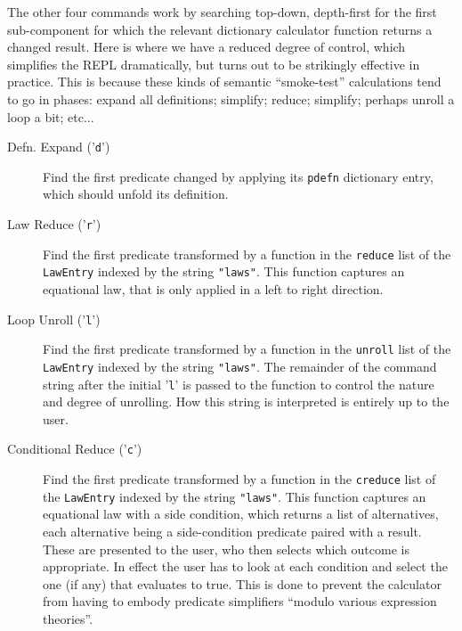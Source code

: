 The other four commands work by searching top-down, depth-first for
the first sub-component for which the relevant dictionary calculator
function returns a changed result.
Here is where we have a reduced degree of control,
which simplifies the REPL dramatically,
but turns out to be strikingly effective in practice.
This is because these kinds of semantic ``smoke-test'' calculations
tend to go in phases: expand all definitions; simplify; reduce; simplify;
perhaps unroll a loop a bit; etc...
\begin{description}
  \item[Defn. Expand ('\texttt{d}')]
    Find the first predicate changed by applying its
     \texttt{pdefn} dictionary entry, which should unfold its definition.
  \item[Law Reduce ('\texttt{r}')]
    Find the first predicate transformed by a function
    in the \texttt{reduce} list of the \texttt{LawEntry} indexed
     by the string \texttt{"laws"}.
     This function captures an equational law,
     that is only applied in a left to right direction.
  \item[Loop Unroll ('\texttt{l}')]
    Find the first predicate transformed by a function
    in the \texttt{unroll} list of the \texttt{LawEntry} indexed
     by the string \texttt{"laws"}.
    The remainder of the command string after the initial '\texttt{l}'
    is passed to the function to control the nature and degree
    of unrolling. How this string is interpreted is entirely
    up to the user.
  \item[Conditional Reduce ('\texttt{c}')]
    Find the first predicate transformed by a function
    in the \texttt{creduce} list of the \texttt{LawEntry} indexed
     by the string \texttt{"laws"}.
     This function captures an equational law with a side condition,
    which returns a list of alternatives,
    each alternative being a side-condition predicate
    paired with a result.
    These are presented to the user,
    who then selects which outcome is appropriate.
    In effect the user has to look at each condition
    and select the one (if any) that evaluates to true.
    This is done to prevent the calculator from having
    to embody predicate simplifiers ``modulo various expression theories''.
\end{description}
